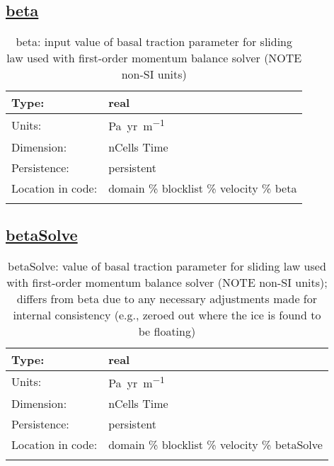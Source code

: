 \subsection[beta]{\hyperref[sec:var_tab_velocity]{beta}}
\label{subsec:var_sec_velocity_beta}
\begin{center}
\begin{longtable}{| p{2.0in} | p{4.0in} |}
        \hline 
        Type: & real \\
        \hline 
        Units: & \si{Pa.yr.m^{-1}} \\
        \hline 
        Dimension: & nCells Time \\
        \hline 
        Persistence: & persistent \\
        \hline 
         Location in code: & domain \% blocklist \% velocity \% beta \\
         \hline 
    \caption{beta: input value of basal traction parameter for sliding law used with first-order momentum balance solver (NOTE non-SI units)}
\end{longtable}
\end{center}
\subsection[betaSolve]{\hyperref[sec:var_tab_velocity]{betaSolve}}
\label{subsec:var_sec_velocity_betaSolve}
\begin{center}
\begin{longtable}{| p{2.0in} | p{4.0in} |}
        \hline 
        Type: & real \\
        \hline 
        Units: & \si{Pa.yr.m^{-1}} \\
        \hline 
        Dimension: & nCells Time \\
        \hline 
        Persistence: & persistent \\
        \hline 
         Location in code: & domain \% blocklist \% velocity \% betaSolve \\
         \hline 
    \caption{betaSolve: value of basal traction parameter for sliding law used with first-order momentum balance solver (NOTE non-SI units); differs from beta due to any necessary adjustments made for internal consistency (e.g., zeroed out where the ice is found to be floating)}
\end{longtable}
\end{center}
